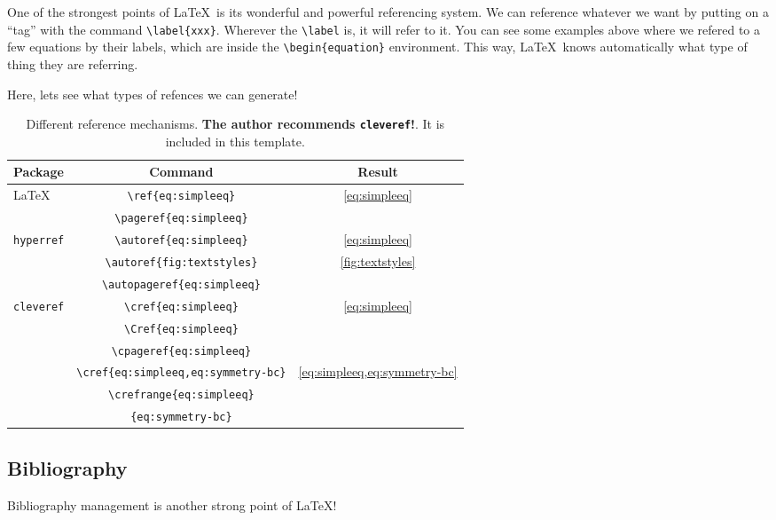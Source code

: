 One of the strongest points of \LaTeX\ is its wonderful and powerful referencing system. We can reference whatever we want by putting on a ``tag'' with the command \verb|\label{xxx}|. Wherever the \verb|\label| is, it will refer to it. You can see some examples above where we refered to a few equations by their labels, which are inside the \verb|\begin{equation}| environment. This way, \LaTeX\ knows automatically what type of thing they are referring.

Here, lets see what types of refences we can generate!

\begin{table}[h]
	\centering
	\begin{tabular}{lcc}
	  \toprule
	  Package & Command & Result \\
	  \midrule
	  \LaTeX & \verb|\ref{eq:simpleeq}| & \ref{eq:simpleeq} \\
	  & \verb|\pageref{eq:simpleeq}| & \pageref{eq:simpleeq} \\
	  \cmidrule{2-3}
	  \texttt{hyperref} & \verb|\autoref{eq:simpleeq}| & \autoref{eq:simpleeq} \\
			  & \verb|\autoref{fig:textstyles}| & \autoref{fig:textstyles} \\
			  & \verb|\autopageref{eq:simpleeq}| & \autopageref{eq:simpleeq} \\
	  \cmidrule{2-3}
	  \texttt{cleveref} & \verb|\cref{eq:simpleeq}| & \cref{eq:simpleeq} \\
			  & \verb|\Cref{eq:simpleeq}| & \Cref{eq:simpleeq} \\
	  & \verb|\cpageref{eq:simpleeq}| & \cpageref{eq:simpleeq} \\
			  & \verb|\cref{eq:simpleeq,eq:symmetry-bc}| & \cref{eq:simpleeq,eq:symmetry-bc} \\
			  & \verb|\crefrange{eq:simpleeq}| & \multirow{2}{*}{\crefrange{eq:simpleeq}{eq:symmetry-bc}}\\
	  & \verb|{eq:symmetry-bc}| & \\
	  \bottomrule
	\end{tabular}
	\caption[Different reference mechanisms.]{Different reference mechanisms. \textbf{The author recommends \texttt{cleveref}!}. It is included in this template.}
	\label{tab:reference-systems}
\end{table}

\subsection{Bibliography}

Bibliography management is another strong point of \LaTeX!



